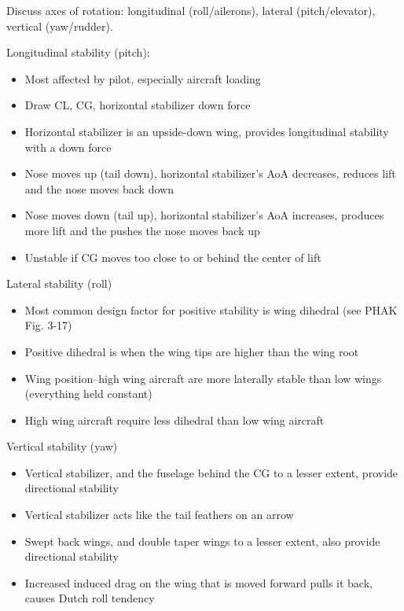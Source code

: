 \documentclass[twoside,openright]{report}
\begin{document}
Discuss axes of rotation: longitudinal (roll/ailerons), lateral
(pitch/elevator), vertical (yaw/rudder).

Longitudinal stability (pitch):

\begin{itemize}
  \item Most affected by pilot, especially aircraft loading

  \item Draw CL, CG, horizontal stabilizer down force

  \item Horizontal stabilizer is an upside-down wing, provides longitudinal
    stability with a down force

  \item Nose moves up (tail down), horizontal stabilizer's AoA decreases,
    reduces lift and the nose moves back down

  \item Nose moves down (tail up), horizontal stabilizer's AoA increases,
    produces more lift and the pushes the nose moves back up

  \item Unstable if CG moves too close to or behind the center of lift
\end{itemize}

Lateral stability (roll)

\begin{itemize}
  \item Most common design factor for positive stability is wing dihedral (see
    PHAK Fig. 3-17)

  \item Positive dihedral is when the wing tips are higher than the wing root

  \item Wing position--high wing aircraft are more laterally stable than low
    wings (everything held constant)

  \item High wing aircraft require less dihedral than low wing aircraft
\end{itemize}

Vertical stability (yaw)

\begin{itemize}
  \item Vertical stabilizer, and the fuselage behind the CG to a lesser extent,
    provide directional stability

  \item Vertical stabilizer acts like the tail feathers on an arrow

  \item Swept back wings, and double taper wings to a lesser extent, also
    provide directional stability

  \item Increased induced drag on the wing that is moved forward pulls it back,
    causes Dutch roll tendency
\end{itemize}
\end{document}
